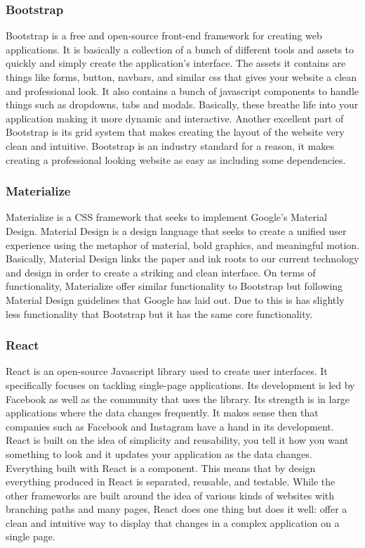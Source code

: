 \subsubsection{Bootstrap}
Bootstrap is a free and open-source front-end framework for creating web applications. 
It is basically a collection of a bunch of different tools and assets to quickly and simply create the application’s interface. 
The assets it contains are things like forms, button, navbars, and similar css that gives your website a clean and professional look. 
It also contains a bunch of javascript components to handle things such as dropdowns, tabs and modals. 
Basically, these breathe life into your application making it more dynamic and interactive. 
Another excellent part of Bootstrap is its grid system that makes creating the layout of the website very clean and intuitive. 
Bootstrap is an industry standard for a reason, it makes creating a professional looking website as easy as including some dependencies.

\subsubsection{Materialize}
Materialize is a CSS framework that seeks to implement Google’s Material Design. 
Material Design is a design language that seeks to create a unified user experience using the metaphor of material, bold graphics, and meaningful motion. 
Basically, Material Design links the paper and ink roots to our current technology and design in order to create a striking and clean interface. 
On terms of functionality, Materialize offer similar functionality to Bootstrap but following Material Design guidelines that Google has laid out. 
Due to this is has slightly less functionality that Bootstrap but it has the same core functionality.

\subsubsection{React}
React is an open-source Javascript library used to create user interfaces. 
It specifically focuses on tackling single-page applications. 
Its development is led by Facebook as well as the community that uses the library. 
Its strength is in large applications where the data changes frequently. 
It makes sense then that companies such as Facebook and Instagram have a hand in its development. 
React is built on the idea of simplicity and reusability, you tell it how you want something to look and it updates your application as the data changes. 
Everything built with React is a component. 
This means that by design everything produced in React is separated, reusable, and testable. 
While the other frameworks are built around the idea of various kinds of websites with branching paths and many pages, React does one thing but does it well: offer a clean and intuitive way to display that changes in a complex application on a single page.

